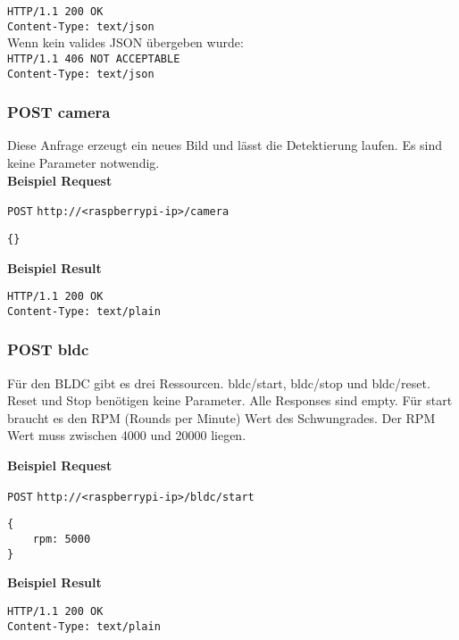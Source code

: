 \texttt{HTTP/1.1 200 OK} \\
\texttt{Content-Type: text/json} \\

\noindent
Wenn kein valides JSON übergeben wurde: \\

\noindent
\texttt{HTTP/1.1 406 NOT ACCEPTABLE} \\
\texttt{Content-Type: text/json}


\subsubsection{POST camera}

Diese Anfrage erzeugt ein neues Bild und lässt die Detektierung laufen. Es sind keine Parameter notwendig. \\

\textbf{Beispiel Request}

\texttt{POST}
\texttt{http://<raspberrypi-ip>/camera} \\
\begin{lstlisting}[caption=POST camera Request, tabsize=2]
{}
\end{lstlisting}

\textbf{Beispiel Result}
\begin{lstlisting}[caption=POST camera Response, tabsize=2]
HTTP/1.1 200 OK
Content-Type: text/plain
\end{lstlisting}



\subsubsection{POST bldc}

Für den BLDC gibt es drei Ressourcen. bldc/start, bldc/stop und bldc/reset. Reset und Stop benötigen keine Parameter. Alle Responses sind empty. Für start braucht es den RPM (Rounds per Minute) Wert des Schwungrades. Der RPM Wert muss zwischen 4000 und 20000 liegen.

\textbf{Beispiel Request}

\texttt{POST}
\texttt{http://<raspberrypi-ip>/bldc/start} \\
\begin{lstlisting}[caption=POST bldc/start Request, tabsize=2]
{
    rpm: 5000
}
\end{lstlisting}

\textbf{Beispiel Result}
\begin{lstlisting}[caption=POST bldc/start Response, tabsize=2]
HTTP/1.1 200 OK
Content-Type: text/plain
\end{lstlisting}




